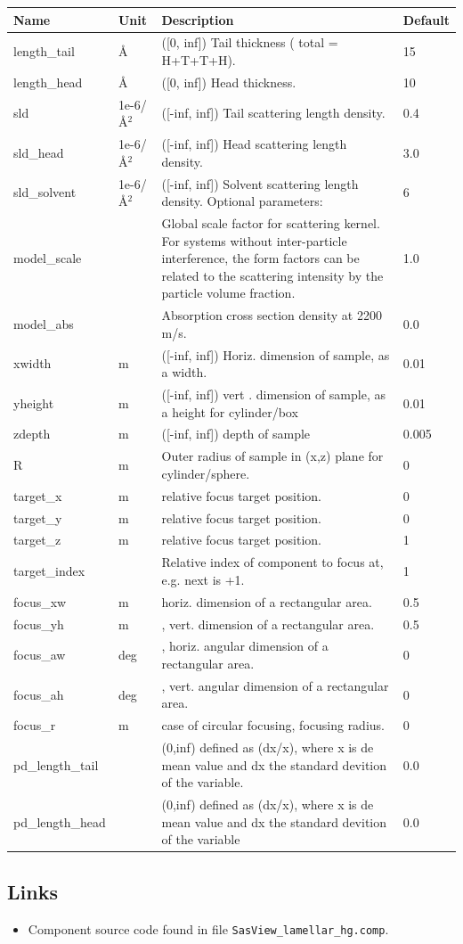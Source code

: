 \begin{longtable}{p{}p{}p{}p{}}
\toprule
\textbf{Name} & \textbf{Unit} & \textbf{Description} & \textbf{Default} \\
\midrule
\endhead
length\_tail & \AA{} & ([0, inf]) Tail thickness ( total = H+T+T+H). & 15 \\
length\_head & \AA{} & ([0, inf]) Head thickness. & 10 \\
sld & 1e-6/\AA{}$^{2}$ & ([-inf, inf]) Tail scattering length density. & 0.4 \\
sld\_head & 1e-6/\AA{}$^{2}$ & ([-inf, inf]) Head scattering length density. & 3.0 \\
sld\_solvent & 1e-6/\AA{}$^{2}$ & ([-inf, inf]) Solvent scattering length density. Optional parameters: & 6 \\
model\_scale &   & Global scale factor for scattering kernel. For systems without inter-particle interference, the form factors can be related to the scattering intensity by the particle volume fraction. & 1.0 \\
model\_abs &   & Absorption cross section density at 2200 m/s. & 0.0 \\
xwidth & m & ([-inf, inf]) Horiz. dimension of sample, as a width. & 0.01 \\
yheight & m & ([-inf, inf]) vert . dimension of sample, as a height for cylinder/box & 0.01 \\
zdepth & m & ([-inf, inf]) depth of sample & 0.005 \\
R & m & Outer radius of sample in (x,z) plane for cylinder/sphere. & 0 \\
target\_x & m & relative focus target position. & 0 \\
target\_y & m & relative focus target position. & 0 \\
target\_z & m & relative focus target position. & 1 \\
target\_index &   & Relative index of component to focus at, e.g. next is +1. & 1 \\
focus\_xw & m & horiz. dimension of a rectangular area. & 0.5 \\
focus\_yh & m & , vert. dimension of a rectangular area. & 0.5 \\
focus\_aw & deg & , horiz. angular dimension of a rectangular area. & 0 \\
focus\_ah & deg & , vert. angular dimension of a rectangular area. & 0 \\
focus\_r & m & case of circular focusing, focusing radius. & 0 \\
pd\_length\_tail &  & (0,inf) defined as (dx/x), where x is de mean value and dx the standard devition of the variable. & 0.0 \\
pd\_length\_head &  & (0,inf) defined as (dx/x), where x is de mean value and dx the standard devition of the variable & 0.0 \\
\bottomrule
\end{longtable}

\subsection*{Links}
\begin{itemize}
  \item Component source code found in file \texttt{SasView\_lamellar\_hg.comp}.
\end{itemize}
